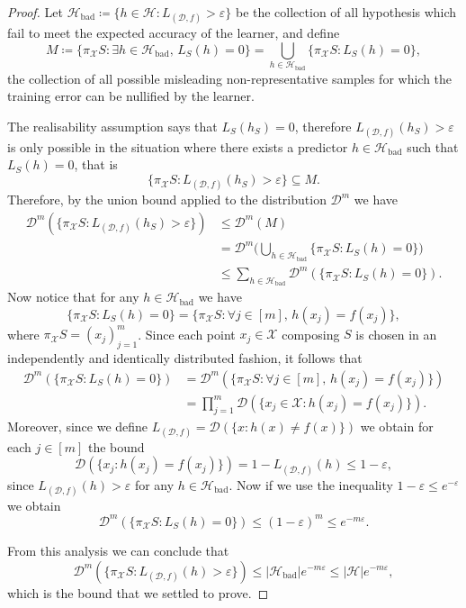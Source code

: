 \begin{proof}
Let
\(\mathcal{H}_{\text{bad}} \coloneq \{h \in \mathcal{H} \colon L_{(\mathcal{D},
  f)} > \varepsilon\}\) be the collection of all hypothesis which fail to meet
the expected accuracy of the learner, and define
\[
M \coloneq
\{\pi_{\mathcal{X}} S \colon \exists h \in \mathcal{H}_{\text{bad}},\, L_S(h) = 0\}
= \bigcup_{h \in \mathcal{H}_{\text{bad}}}
\{\pi_{\mathcal{X}} S \colon L_S(h) = 0\},
\]
the collection of all possible misleading non-representative samples for which
the training error can be nullified by the learner.

The realisability assumption says that \(L_S(h_S) = 0\), therefore
\(L_{(\mathcal{D}, f)}(h_S) > \varepsilon\) is only possible in the situation
where there exists a predictor \(h \in \mathcal{H}_{\text{bad}}\) such that
\(L_S(h) = 0\), that is
\[
\{\pi_{\mathcal{X}} S \colon L_{(\mathcal{D}, f)}(h_S) > \varepsilon\} \subseteq M.
\]
Therefore, by the union bound applied to the distribution \(\mathcal{D}^m\) we have
\begin{align*}
  \mathcal{D}^m(\{\pi_{\mathcal{X}} S \colon L_{(\mathcal{D}, f)}(h_S) > \varepsilon\})
  &\leq \mathcal{D}^m(M) \\
  &= \mathcal{D}^m \Big(
      \bigcup_{h \in \mathcal{H}_{\text{bad}}}
      \{\pi_{\mathcal{X}} S \colon L_S(h) = 0\}
    \Big) \\
  &\leq \sum_{h \in \mathcal{H}_{\text{bad}}}
    \mathcal{D}^m(\{\pi_{\mathcal{X}} S \colon L_S(h) = 0\}).
\end{align*}
Now notice that for any \(h \in \mathcal{H}_{\text{bad}}\) we have
\[
\{\pi_{\mathcal{X}} S \colon L_S(h) = 0\}
= \{\pi_{\mathcal{X}} S \colon \forall j \in [m],\, h(x_j) = f(x_j)\},
\]
where \(\pi_{\mathcal{X}} S = (x_j)_{j=1}^m\). Since each point \(x_j \in
\mathcal{X}\) composing \(S\) is chosen in an independently and identically
distributed fashion, it follows that
\begin{align*}
  \mathcal{D}^m(\{\pi_{\mathcal{X}} S \colon L_S(h) = 0\})
  &= \mathcal{D}^m(
    \{\pi_{\mathcal{X}} S \colon \forall j \in [m],\, h(x_j) = f(x_j)\}) \\
  &= \prod_{j=1}^m \mathcal{D}(\{x_j \in \mathcal{X} \colon h(x_j) = f(x_j)\}).
\end{align*}
Moreover, since we define
\(L_{(\mathcal{D}, f)} = \mathcal{D}(\{x \colon h(x) \neq f(x)\})\) we obtain
for each \(j \in [m]\) the bound
\[
\mathcal{D}(\{x_j \colon h(x_j) = f(x_j)\})
= 1 - L_{(\mathcal{D}, f)}(h)
\leq 1 - \varepsilon,
\]
since \(L_{(\mathcal{D}, f)}(h) > \varepsilon\) for any
\(h \in \mathcal{H}_{\text{bad}}\). Now if we use the inequality \(1 -
\varepsilon \leq e^{-\varepsilon}\) we obtain
\[
\mathcal{D}^m(\{\pi_{\mathcal{X}} S \colon L_S(h) = 0\})
\leq (1 - \varepsilon)^m
\leq e^{-m \varepsilon}.
\]

From this analysis we can conclude that
\[
\mathcal{D}^m(\{\pi_{\mathcal{X}} S \colon L_{(\mathcal{D}, f)}(h) > \varepsilon\})
\leq |\mathcal{H}_{\text{bad}}| e^{-m \varepsilon}
\leq |\mathcal{H}| e^{-m \varepsilon},
\]
which is the bound that we settled to prove.
\end{proof}

